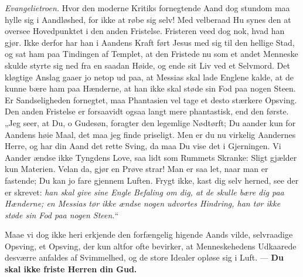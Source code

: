 \documentclass[12pt,a4paper]{book}
\begin{document}
\emph{Evangelietroen.} Hvor den moderne Kritiks fornegtende Aand dog stundom maa hylle sig
i Aandløshed, for ikke at røbe sig selv! Med velberaad Hu synes den at oversee
Hovedpunktet i den anden Fristelse. Fristeren veed dog nok, hvad han gjør. Ikke derfor har
han i Aandens Kraft ført Jesus med sig til den hellige Stad, og sat ham paa Tindingen af
Templet, at den Fristede nu som et andet Menneske skulde styrte sig ned fra en saadan
Høide, og ende sit Liv ved et Selvmord. Det kløgtige Anslag gaaer jo netop ud paa, at
Messias skal lade Englene kalde, at de kunne bære ham paa Hænderne, at han ikke skal støde
sin Fod paa nogen Steen. Er Sandseligheden fornegtet, maa Phantasien vel tage et desto
stærkere Opsving. Den anden Fristelse er forsaavidt ogsaa langt mere phantastisk, end den
første. „Jeg seer, at Du, o Gudesøn, foragter den legemlige Nødtørft; Du aander kun for
Aandens høie Maal, det maa jeg finde priseligt. Men er du nu virkelig Aandernes Herre, og
har din Aand det rette Sving, da maa Du vise det i Gjerningen. Vi Aander ændse ikke
Tyngdens Love, saa lidt som Rummets Skranke: Sligt gjælder kun Materien. Velan da, gjør en
Prøve strar! Man er saa let, naar man er fastende; Du kan jo fare gjennem Luften. Frygt
ikke, kast dig selv herned, see der er skrevet: \emph{han skal give sine Engle Befaling om
dig, at de skulle bære dig paa Hænderne; en Messias tør ikke ændse nogen udvortes
Hindring, han tør ikke støde sin Fod paa nogen Steen.}“

Maae vi dog ikke heri erkjende den forfængelig higende Aands vilde, selvraadige Opsving,
et Opsving, der kun altfor ofte bevirker, at Menneskehedens Udkaarede desværre anfaldes af
Svimmelhed, og de store Idealer opløse sig i Luft. --- \textbf{Du skal ikke friste Herren
din Gud.}
\end{document}
